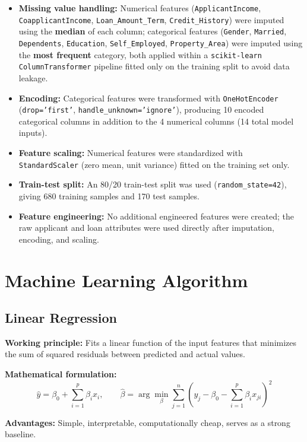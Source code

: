 \documentclass[12pt,a4paper]{article}
\begin{document}
\begin{itemize}
\item \textbf{Missing value handling:} Numerical features (\texttt{ApplicantIncome},
\texttt{CoapplicantIncome}, \texttt{Loan\_Amount\_Term}, \texttt{Credit\_History}) were imputed
using the \textbf{median} of each column; categorical features (\texttt{Gender}, \texttt{Married},
\texttt{Dependents}, \texttt{Education}, \texttt{Self\_Employed}, \texttt{Property\_Area}) were
imputed using the \textbf{most frequent} category, both applied within a
\texttt{scikit-learn} \texttt{ColumnTransformer} pipeline fitted only on the training split to
avoid data leakage.
\item \textbf{Encoding:} Categorical features were transformed with \texttt{OneHotEncoder}
(\texttt{drop='first'}, \texttt{handle\_unknown='ignore'}), producing 10 encoded categorical
columns in addition to the 4 numerical columns (14 total model inputs).
\item \textbf{Feature scaling:} Numerical features were standardized with \texttt{StandardScaler}
(zero mean, unit variance) fitted on the training set only.
\item \textbf{Train-test split:} An 80/20 train-test split was used (\texttt{random\_state=42}),
giving 680 training samples and 170 test samples.
\item \textbf{Feature engineering:} No additional engineered features were created; the raw
applicant and loan attributes were used directly after imputation, encoding, and scaling.
\end{itemize}

\section{Machine Learning Algorithm}

\subsection*{Linear Regression}
\textbf{Working principle:} Fits a linear function of the input features that minimizes the sum of
squared residuals between predicted and actual values.

\textbf{Mathematical formulation:}
\[
\hat{y} = \beta_0 + \sum_{i=1}^{p}\beta_i x_i, \qquad
\hat{\beta} = \arg\min_{\beta}\sum_{j=1}^{n}\left(y_j - \beta_0 - \sum_{i=1}^{p}\beta_i x_{ji}\right)^2
\]

\textbf{Advantages:} Simple, interpretable, computationally cheap, serves as a strong baseline.
\end{document}
